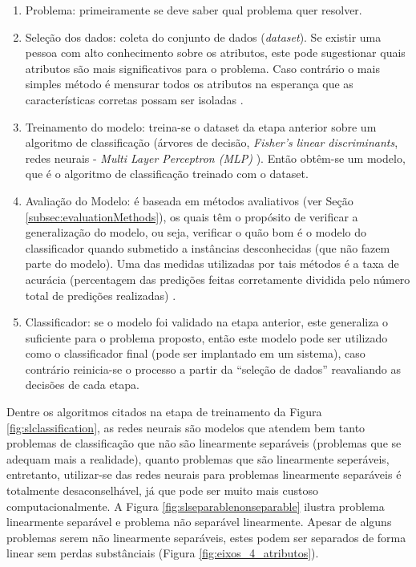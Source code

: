 \begin{enumerate}
\item Problema: primeiramente se deve saber qual problema quer resolver.
\item Seleção dos dados: coleta do conjunto de dados (\textit{dataset}). Se existir uma pessoa com alto conhecimento sobre os atributos, este pode sugestionar quais atributos são mais significativos para o problema. Caso contrário o mais simples método é mensurar todos os atributos na esperança que as características corretas possam ser isoladas \cite{Kotsiantis:2007}.
\item Treinamento do modelo: treina-se o dataset da etapa anterior sobre um algoritmo de classificação (árvores de decisão, \textit{Fisher’s linear discriminants}, redes neurais - \textit{Multi Layer Perceptron (MLP)} \cite{Michie:1994}). Então obtêm-se um modelo, que é o algoritmo de classificação treinado com o dataset.
\item Avaliação do Modelo: é baseada em métodos avaliativos (ver Seção \ref{subsec:evaluationMethods}), os quais têm o propósito de verificar a generalização do modelo, ou seja, verificar o quão bom é o modelo do classificador quando submetido a instâncias desconhecidas (que não fazem parte do modelo). Uma das medidas utilizadas por tais métodos é a taxa de acurácia (percentagem das predições feitas corretamente dividida pelo número total de predições realizadas) \cite{Kotsiantis:2007}.
\item Classificador: se o modelo foi validado na etapa anterior, este generaliza o suficiente para o problema proposto, então este modelo pode ser utilizado como o classificador final (pode ser implantado em um sistema), caso contrário reinicia-se o processo a partir da ``seleção de dados'' reavaliando as decisões de cada etapa.
\end{enumerate}

Dentre os algoritmos citados na etapa de treinamento da Figura \ref{fig:slclassification}, as redes neurais são modelos que atendem bem tanto problemas de classificação que não são linearmente separáveis (problemas que se adequam mais a realidade), quanto problemas que são linearmente seperáveis, entretanto, utilizar-se das redes neurais para problemas linearmente separáveis é totalmente desaconselhável, já que pode ser muito mais custoso computacionalmente.\cite{Zhang:2000}\cite{Elizondo:2006} A Figura \ref{fig:slseparablenonseparable} ilustra problema linearmente separável e problema não separável linearmente. Apesar de alguns problemas serem não linearmente separáveis, estes podem ser separados de forma linear sem perdas substânciais (Figura \ref{fig:eixos_4_atributos}).

